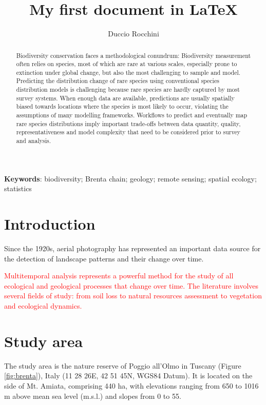 \documentclass[a4paper, 12pt]{article}
\title{My first document in LaTeX} %
\author{Duccio Rocchini}
\newcommand{\tr}{\textcolor{red}}
\begin{document}
\maketitle
\tableofcontents
    
\begin{abstract}
Biodiversity conservation faces a methodological conundrum: Biodiversity measurement often relies on species, most of which are rare at various scales, especially prone
to extinction under global change, but also the most challenging to sample and model.
Predicting the distribution change of rare species using conventional species distribution models is challenging because rare species are hardly captured by most survey
systems. When enough data are available, predictions are usually spatially biased towards locations where the species is most likely to occur, violating the assumptions of
many modelling frameworks. Workflows to predict and eventually map rare species
distributions imply important trade-­offs between data quantity, quality, representativeness and model complexity that need to be considered prior to survey and analysis. 
\end{abstract}

\noindent \textbf{Keywords}: biodiversity; Brenta chain; geology; remote sensing; spatial ecology; statistics 

\section{Introduction}\label{sec:intro}

Since the 1920s, aerial photography has represented an important data source for the detection of landscape patterns and their change over time.

\tr{Multitemporal analysis represents a powerful method for the study of all ecological and geological processes that change over time. The literature involves several fields of study: from soil loss to natural resources assessment to vegetation and ecological dynamics.}



\section{Study area}
The study area is the nature reserve of Poggio all’Olmo in Tuscany (Figure \ref{fig:brenta}), Italy (11 28 26E, 42 51 45N, WGS84 Datum). It is located on the side of Mt. Amiata,
comprising 440 ha, with elevations ranging from 650 to 1016 m above mean sea level (m.s.l.) and slopes from 0 to 55.
\end{document}
